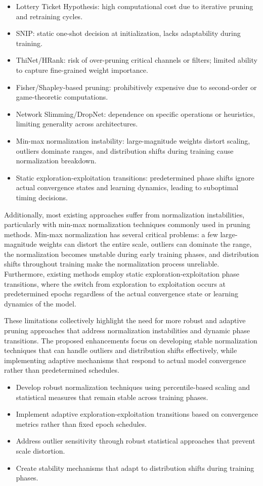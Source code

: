 \documentclass[12pt,a4paper]{report}
\begin{document}
\begin{itemize}
    \item Lottery Ticket Hypothesis: high computational cost due to iterative pruning and retraining cycles.
    \item SNIP: static one-shot decision at initialization, lacks adaptability during training.
    \item ThiNet/HRank: risk of over-pruning critical channels or filters; limited ability to capture fine-grained weight importance.
    \item Fisher/Shapley-based pruning: prohibitively expensive due to second-order or game-theoretic computations.
    \item Network Slimming/DropNet: dependence on specific operations or heuristics, limiting generality across architectures.
    \item Min-max normalization instability: large-magnitude weights distort scaling, outliers dominate ranges, and distribution shifts during training cause normalization breakdown.
    \item Static exploration-exploitation transitions: predetermined phase shifts ignore actual convergence states and learning dynamics, leading to suboptimal timing decisions.
\end{itemize}

Additionally, most existing approaches suffer from normalization instabilities, particularly with min-max normalization techniques commonly used in pruning methods. Min-max normalization has several critical problems: a few large-magnitude weights can distort the entire scale, outliers can dominate the range, the normalization becomes unstable during early training phases, and distribution shifts throughout training make the normalization process unreliable. Furthermore, existing methods employ static exploration-exploitation phase transitions, where the switch from exploration to exploitation occurs at predetermined epochs regardless of the actual convergence state or learning dynamics of the model.

These limitations collectively highlight the need for more robust and adaptive pruning approaches that address normalization instabilities and dynamic phase transitions. The proposed enhancements focus on developing stable normalization techniques that can handle outliers and distribution shifts effectively, while implementing adaptive mechanisms that respond to actual model convergence rather than predetermined schedules.

\begin{itemize}
    \item Develop robust normalization techniques using percentile-based scaling and statistical measures that remain stable across training phases.
    \item Implement adaptive exploration-exploitation transitions based on convergence metrics rather than fixed epoch schedules.
    \item Address outlier sensitivity through robust statistical approaches that prevent scale distortion.
    \item Create stability mechanisms that adapt to distribution shifts during training phases.
\end{itemize}
\end{document}
